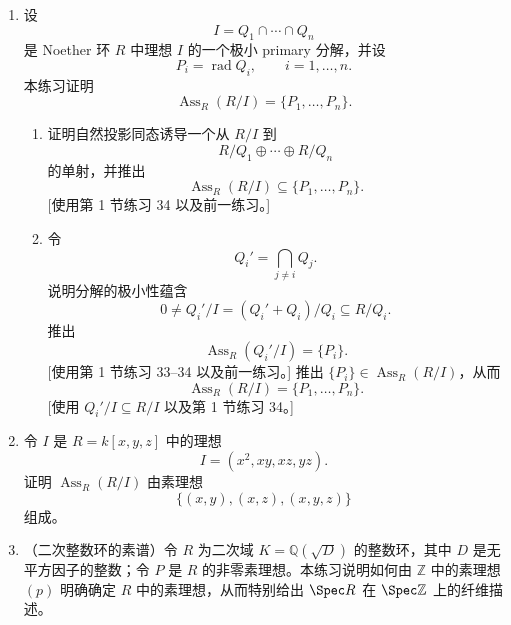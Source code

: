 \begin{enumerate}[label=\arabic*.]
\begin{enumerate}[label=(\alph*)]
		\item 对 $R$ 的任意理想 $Q$，设 $0\ne M\subseteq R/Q$。证明 $\operatorname{Ann}(M)$ 的根是 $\operatorname{Supp}(M)$ 中素理想的交。[使用命题 12 与练习 25。]
		
		\item 对 (b) 中的 $M$，证明 $\operatorname{Ann}M$ 的根也等于 $\operatorname{Ass}_R(M)$ 中素理想的交。[使用练习 26(b)。]
		
		\item 若 $Q$ 是 $R$ 的理想且 $\operatorname{Ass}_R(R/Q)=\{P\}$，证明 $\operatorname{rad}Q=P$。[使用 $Q=\operatorname{Ann}(R/Q)$ 以及 (c)。]
		
		\item 若 $Q$ 是 $R$ 的理想且 $\operatorname{Ass}_R(R/Q)=\{P\}$，证明 $Q$ 是 $P$-primary。[若 $ab\in Q$ 且 $a\notin Q$，考虑
		\[
		0\ne M=(Ra+Q)/Q\subseteq R/Q,
		\]
		并说明 $b$ 属于 $\operatorname{Ann}M\subseteq\operatorname{rad}\operatorname{Ann}(M)$。使用第 1 节练习 33--34 说明 $\operatorname{Ass}_R(M)=\{P\}$，再用 (c) 说明 $\operatorname{rad}\operatorname{Ann}(M)=P$，最后推出 $b\in P$。]
	\end{enumerate}
	
	\item 设
	\[
	I=Q_1\cap\cdots\cap Q_n
	\]
	是 Noether 环 $R$ 中理想 $I$ 的一个极小 primary 分解，并设
	\[
	P_i=\operatorname{rad}Q_i,
	\qquad i=1,\ldots,n.
	\]
	本练习证明
	\[
	\operatorname{Ass}_R(R/I)=\{P_1,\ldots,P_n\}.
	\]
	\begin{enumerate}[label=(\alph*)]
		\item 证明自然投影同态诱导一个从 $R/I$ 到
		\[
		R/Q_1\oplus\cdots\oplus R/Q_n
		\]
		的单射，并推出
		\[
		\operatorname{Ass}_R(R/I)\subseteq\{P_1,\ldots,P_n\}.
		\]
		[使用第 1 节练习 34 以及前一练习。]
		
		\item 令
		\[
		Q_i'=\bigcap_{j\ne i}Q_j.
		\]
		说明分解的极小性蕴含
		\[
		0\ne Q_i'/I=(Q_i'+Q_i)/Q_i\subseteq R/Q_i.
		\]
		推出
		\[
		\operatorname{Ass}_R(Q_i'/I)=\{P_i\}.
		\]
		[使用第 1 节练习 33--34 以及前一练习。] 推出 $\{P_i\}\in\operatorname{Ass}_R(R/I)$，从而
		\[
		\operatorname{Ass}_R(R/I)=\{P_1,\ldots,P_n\}.
		\]
		[使用 $Q_i'/I\subseteq R/I$ 以及第 1 节练习 34。]
	\end{enumerate}
	
	\item 令 $I$ 是 $R=k[x,y,z]$ 中的理想
	\[
	I=(x^2,xy,xz,yz).
	\]
	证明 $\operatorname{Ass}_R(R/I)$ 由素理想
	\[
	\{(x,y),(x,z),(x,y,z)\}
	\]
	组成。
	
	\item （二次整数环的素谱）令 $R$ 为二次域 $K=\mathbb Q(\sqrt D)$ 的整数环，其中 $D$ 是无平方因子的整数；令 $P$ 是 $R$ 的非零素理想。本练习说明如何由 $\mathbb Z$ 中的素理想 $(p)$ 明确确定 $R$ 中的素理想，从而特别给出 $\Spec R$ 在 $\Spec\mathbb Z$ 上的纤维描述。
	

\end{enumerate}
